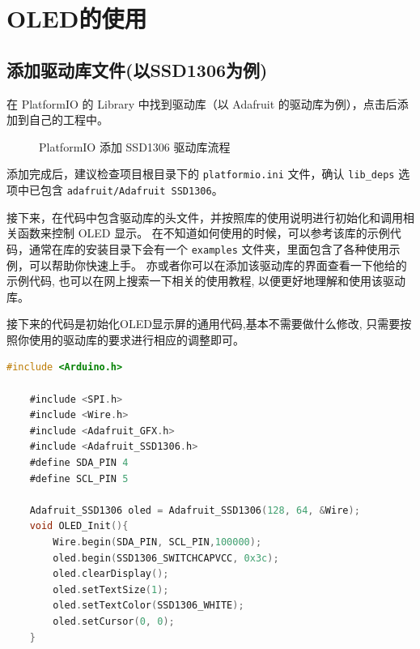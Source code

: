 \section{OLED的使用}
\subsection{添加驱动库文件(以SSD1306为例)}
在 PlatformIO 的 Library 中找到驱动库（以 Adafruit 的驱动库为例），点击后添加到自己的工程中。

\begin{figure}[htbp]
    \centering

    \caption{PlatformIO 添加 SSD1306 驱动库流程}
    \label{fig:pio_lib_add}
\end{figure}

添加完成后，建议检查项目根目录下的 \texttt{platformio.ini} 文件，确认 \texttt{lib\_deps} 选项中已包含 \texttt{adafruit/Adafruit SSD1306}。
\par
接下来，在代码中包含驱动库的头文件，并按照库的使用说明进行初始化和调用相关函数来控制 OLED 显示。
在不知道如何使用的时候，可以参考该库的示例代码，通常在库的安装目录下会有一个 \texttt{examples} 文件夹，里面包含了各种使用示例，可以帮助你快速上手。
亦或者你可以在添加该驱动库的界面查看一下他给的示例代码, 也可以在网上搜索一下相关的使用教程, 以便更好地理解和使用该驱动库。
\par
接下来的代码是初始化OLED显示屏的通用代码,基本不需要做什么修改, 只需要按照你使用的驱动库的要求进行相应的调整即可。
\begin{lstlisting}[language=C]
    #include <Arduino.h>

    #include <SPI.h>
    #include <Wire.h>
    #include <Adafruit_GFX.h>
    #include <Adafruit_SSD1306.h>
    #define SDA_PIN 4
    #define SCL_PIN 5

    Adafruit_SSD1306 oled = Adafruit_SSD1306(128, 64, &Wire);
    void OLED_Init(){
        Wire.begin(SDA_PIN, SCL_PIN,100000);
        oled.begin(SSD1306_SWITCHCAPVCC, 0x3c);
        oled.clearDisplay();
        oled.setTextSize(1);
        oled.setTextColor(SSD1306_WHITE);
        oled.setCursor(0, 0);
    }
\end{lstlisting}    
